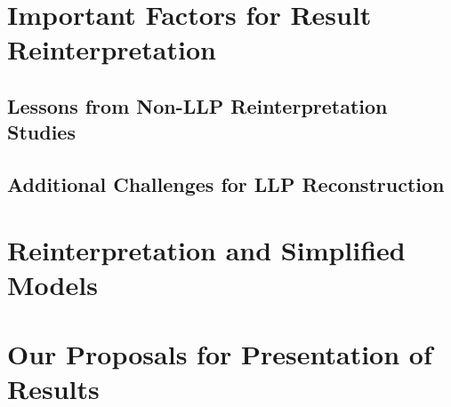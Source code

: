 \section{Important Factors for Result Reinterpretation}

\subsection{Lessons from Non-LLP Reinterpretation Studies}
\subsection{Additional Challenges for LLP Reconstruction}

\section{Reinterpretation and Simplified Models}

\section{Our Proposals for Presentation of Results}